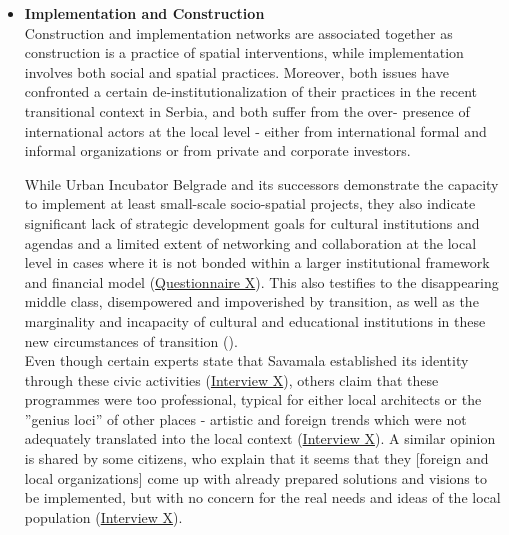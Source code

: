 \documentclass[11pt]{report}
\begin{document}
{{{{\begin{itemize}
Apart from the authoritarian hierarchy of institutional power that empowers certain institutions to exceed or bias their jurisdictions, the issue of individual responsibility is seriously taken into account in the old socialist manner. Namely, most public officers avoid taking responsibility and therefore split it among themselves. In practice, having many people signing a document usually means slowing down and encumbering the process and postponing implementation
(\href{InterviewX}{Interview X}).
In such circumstances, manipulation, clientelism and paternalism became the most successful strategy to navigate through the existing system nurturing multiple institutional zombies from previous socialist times (\href{Vujosevic}{\citealt{vujosevic_collapse_2010}}). 
\\

\item \textbf{Implementation and Construction}
\\
Construction and implementation networks are associated together as construction is a practice of spatial interventions, while implementation involves both social and spatial practices. Moreover, both issues have confronted a certain de-institutionalization of their practices in the recent transitional context in Serbia, and both suffer from the over- presence of international actors at the local level - either from international formal and informal organizations or from private and corporate investors.

While Urban Incubator Belgrade and its successors demonstrate the capacity to implement at least small-scale socio-spatial projects, they also indicate significant lack of strategic development goals for cultural institutions and agendas and a limited extent of networking and collaboration at the local level in cases where it is not bonded within a larger institutional framework and financial model (\href{Questionnaire Experts post-socialist}{Questionnaire X}).
This also testifies to the disappearing middle class, disempowered and impoverished by transition, as well as the marginality and incapacity of cultural and educational institutions in these new circumstances of transition (\href{Doytchinov}{\citealt{doytchinov_belgrade_2015}}).
\\
Even though certain experts state that Savamala established its identity through these civic activities (\href{InterviewX}{Interview X}),
others claim that these programmes were too professional, typical for either local architects or the ”genius loci” of other places - artistic and foreign trends which were not adequately translated into the local context (\href{InterviewX}{Interview X}).
A similar opinion is shared by some citizens, who explain that it seems that they [foreign and local organizations] come up with already prepared solutions and visions to be implemented, but with no concern for the real needs and ideas of the local population (\href{InterviewX}{Interview X}).


\end{itemize}}}}}
\end{document}
